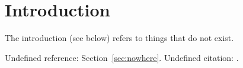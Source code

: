 \section{Introduction}
The introduction (see below) refers to things
that do not exist.

Undefined reference: Section~\ref{sec:nowhere}.
Undefined citation: \cite{knuth1984}.
